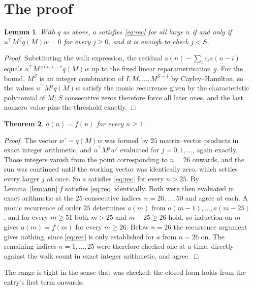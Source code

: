 \documentclass[11pt,a4paper]{article}
\theoremstyle{plain}
\newtheorem{theorem}{Theorem}
\newtheorem{lemma}[theorem]{Lemma}
\theoremstyle{definition}
\begin{document}
\section{The proof}

\begin{lemma}\label{lem:crit}
With $q$ as above, $a$ satisfies \eqref{eq:rec} for all large $n$ if and only if
$u^{\!\top}M^{\,j}q(M)w=0$ for every $j\ge0$, and it is enough to check $j<S$.
\end{lemma}

\begin{proof}
Substituting the walk expression, the residual $a(n)-\sum_ic_ia(n-i)$ equals
$u^{\!\top}M^{\,g(n)-r}q(M)w$ up to the fixed linear reparametrisation $g$. For the bound,
$M^{S}$ is an integer combination of $I,M,\dots,M^{S-1}$ by Cayley--Hamilton, so the values
$u^{\!\top}M^{j}q(M)w$ satisfy the monic recurrence given by the characteristic polynomial of
$M$; $S$ consecutive zeros therefore force all later ones, and the last nonzero value pins the
threshold exactly.
\end{proof}

\begin{theorem}
$a(n)=f(n)$ for every $n\ge1$.
\end{theorem}

\begin{proof}
The vector $w'=q(M)w$ was formed by $25$ matrix--vector products in exact integer
arithmetic, and $u^{\!\top}M^{j}w'$ evaluated for $j=0,1,\dots$, again exactly. Those integers
vanish from the point corresponding to $n=26$ onwards, and the run was continued until the
working vector was identically zero, which settles every larger $j$ at once. So $a$ satisfies
\eqref{eq:rec} for every $n>25$. By Lemma~\ref{lem:ann} $f$ satisfies \eqref{eq:rec}
identically. Both were then evaluated in exact arithmetic at the $25$ consecutive indices
$n=26,\dots,50$ and agree at each. A monic recurrence of order $25$
determines $a(m)$ from $a(m-1),\dots,a(m-25)$, and for every $m\ge51$ both
$m>25$ and $m-25\ge26$ hold, so induction on $m$ gives $a(m)=f(m)$ for every
$m\ge26$.
Below $n=26$ the recurrence argument gives nothing, since \eqref{eq:rec} is only
established for $a$ from $n=26$ on. The remaining indices $n=1,\dots,25$ were
therefore checked one at a time, directly against the walk count in exact integer arithmetic,
and agree.
\end{proof}

The range is tight in the sense that was checked: the closed form holds from the entry's first term onwards.
\end{document}
